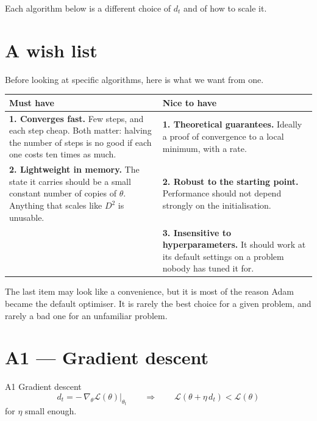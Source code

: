 \documentclass[11pt]{article}
\newcommand{\Loss}{\mathcal{L}}
\begin{document}
\noindent
Each algorithm below is a different choice of $d_t$ and of how to scale it.

\section{A wish list}

Before looking at specific algorithms, here is what we want from one.

\begin{center}
\small
\begin{tabular}{@{}p{} p{}@{}}
\toprule
\textbf{Must have} & \textbf{Nice to have} \\
\midrule
\textbf{1. Converges fast.} Few steps, and each step cheap. Both matter: halving the
number of steps is no good if each one costs ten times as much.
&
\textbf{1. Theoretical guarantees.} Ideally a proof of convergence to a local minimum,
with a rate.
\\[6pt]
\textbf{2. Lightweight in memory.} The state it carries should be a small constant
number of copies of $\theta$. Anything that scales like $D^2$ is unusable.
&
\textbf{2. Robust to the starting point.} Performance should not depend strongly on the
initialisation.
\\[6pt]
&
\textbf{3. Insensitive to hyperparameters.} It should work at its default settings on a
problem nobody has tuned it for.
\\
\bottomrule
\end{tabular}
\end{center}

\begin{asidebox}
The last item may look like a convenience, but it is most of the reason Adam became the
default optimiser. It is rarely the best choice for a given problem, and rarely a bad one
for an unfamiliar problem.
\end{asidebox}

\section{A1 --- Gradient descent}

\begin{algbox}{A1 \; Gradient descent}
\[
  d_{t} = -\,\nabla_{\theta}\Loss(\theta)\Big|_{\theta_{t}}
  \qquad\Longrightarrow\qquad
  \Loss(\theta + \eta\, d_{t}) < \Loss(\theta)
\]
for $\eta$ small enough.
\end{algbox}
\end{document}
